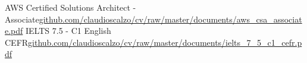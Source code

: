 



\begin{cvskills}

	\cvskill
{AWS Certified Solutions Architect - Associate}{\href{https://github.com/claudioscalzo/cv/raw/master/documents/aws\_csa\_associate.pdf}{github.com/claudioscalzo/cv/raw/master/documents/aws\_csa\_associate.pdf}}
	\cvskill
{IELTS 7.5 - C1 English CEFR}{\href{https://github.com/claudioscalzo/cv/raw/master/documents/ielts\_7\_5\_c1\_cefr.pdf}{github.com/claudioscalzo/cv/raw/master/documents/ielts\_7\_5\_c1\_cefr.pdf}}

\end{cvskills}
